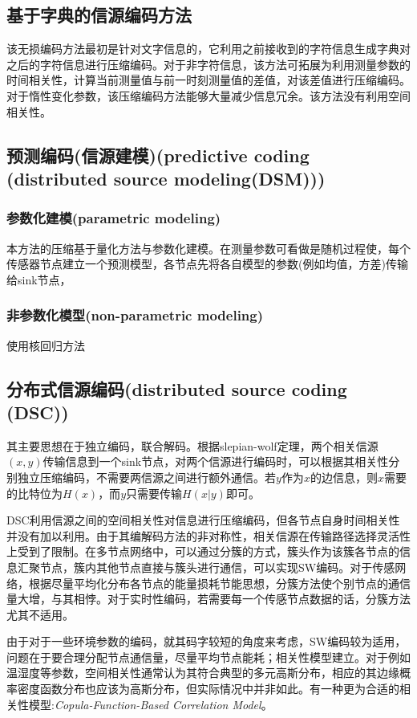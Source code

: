 \subsection{基于字典的信源编码方法}
该无损编码方法最初是针对文字信息的，它利用之前接收到的字符信息生成字典对之后的字符信息进行压缩编码。对于非字符信息，该方法可拓展为利用测量参数的时间相关性，计算当前测量值与前一时刻测量值的差值，对该差值进行压缩编码。\textcolor[rgb]{1,0,0}{对于惰性变化参数，该压缩编码方法能够大量减少信息冗余}。\textcolor[rgb]{0,0,1}{该方法没有利用空间相关性}。

\subsection{预测编码(信源建模)(predictive coding (distributed source modeling(DSM)))}
\subsubsection{参数化建模(parametric modeling)}
本方法的压缩基于量化方法与参数化建模。在测量参数可看做是随机过程使，每个传感器节点建立一个预测模型，各节点先将各自模型的参数(例如均值，方差)传输给sink节点，
\subsubsection{非参数化模型(non-parametric modeling)}
使用核回归方法



\subsection{分布式信源编码(distributed source coding (DSC))}
其主要思想在于独立编码，联合解码。根据slepian-wolf定理，两个相关信源$(x,y)$传输信息到一个sink节点，对两个信源进行编码时，可以根据其相关性分别独立压缩编码，不需要两信源之间进行额外通信。若$y$作为$x$的边信息，则$x$需要的比特位为$H(x)$，而$y$只需要传输$H(x|y)$即可。

DSC利用信源之间的空间相关性对信息进行压缩编码，但各节点自身时间相关性并没有加以利用。由于其编解码方法的非对称性，相关信源在传输路径选择灵活性上受到了限制。在多节点网络中，可以通过分簇的方式，簇头作为该簇各节点的信息汇聚节点，簇内其他节点直接与簇头进行通信，可以实现SW编码。\textcolor[rgb]{0,0,1}{对于传感网络，根据尽量平均化分布各节点的能量损耗节能思想，分簇方法使个别节点的通信量大增，与其相悖。对于实时性编码，若需要每一个传感节点数据的话，分簇方法尤其不适用}。

由于对于一些环境参数的编码，就其码字较短的角度来考虑，SW编码较为适用，问题在于\textcolor[rgb]{1,0,0}{要合理分配节点通信量，尽量平均节点能耗；相关性模型建立}。对于例如温湿度等参数，空间相关性通常认为其符合典型的多元高斯分布，相应的其边缘概率密度函数分布也应该为高斯分布，但实际情况中并非如此。有一种更为合适的相关性模型:\emph{\textcolor[rgb]{1,0,0}{Copula-Function-Based Correlation Model}}。

